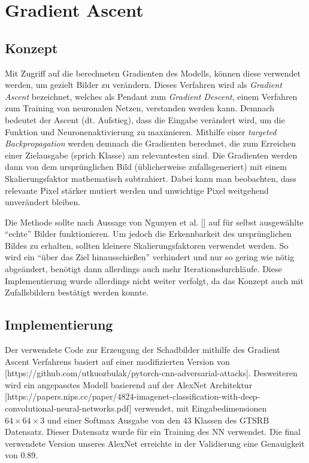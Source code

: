 \chapter{Gradient Ascent}
\label{cha:gascent}
\section{Konzept}

Mit Zugriff auf die berechneten Gradienten des Modells, können diese verwendet werden, um gezielt Bilder zu verändern. Dieses Verfahren wird als \textit{Gradient Ascent} bezeichnet, welches als Pendant zum \textit{Gradient Descent}, einem Verfahren zum Training von neuronalen Netzen, verstanden werden kann. Demnach bedeutet der Ascent (dt. Aufstieg), dass die Eingabe verändert wird, um die Funktion und Neuronenaktivierung zu maximieren. Mithilfe einer \textit{targeted Backpropagation} werden demnach die Gradienten berechnet, die zum Erreichen einer Zielausgabe (sprich Klasse) am relevantesten sind. Die Gradienten werden dann von dem ursprünglichen Bild (üblicherweise zufallsgeneriert) mit einem Skalierungsfaktor mathematisch subtrahiert. Dabei kann man beobachten, dass relevante Pixel stärker mutiert werden und unwichtige Pixel weitgehend unverändert bleiben.

Die Methode sollte nach Aussage von Ngunyen et al. [] auf für selbst ausgewählte "`echte"' Bilder funktionieren. Um jedoch die Erkennbarkeit des ursprünglichen Bildes zu erhalten, sollten kleinere Skalierungsfaktoren verwendet werden. So wird ein "`über das Ziel hinausschießen"' verhindert und nur so gering wie nötig abgeändert, benötigt dann allerdings auch mehr Iterationsdurchläufe.
Diese Implementierung wurde allerdings nicht weiter verfolgt, da das Konzept auch mit Zufallsbildern bestätigt werden konnte.

\section{Implementierung}
Der verwendete Code zur Erzeugung der Schadbilder mithilfe des Gradient Ascent Verfahrens basiert auf einer modifizierten Version von [https://github.com/utkuozbulak/pytorch-cnn-adversarial-attacks]. Desweiteren wird ein angepasstes Modell basierend auf der AlexNet Architektur [https://papers.nips.cc/paper/4824-imagenet-classification-with-deep-convolutional-neural-networks.pdf] verwendet, mit Eingabedimensionen $64\times64\times3$ und einer Softmax Ausgabe von den 43 Klassen des GTSRB Datensatz. 
Dieser Datensatz wurde für ein Training des NN verwendet. 
Die final verwendete Version unseres AlexNet erreichte in der Validierung eine Genauigkeit von 0.89.


